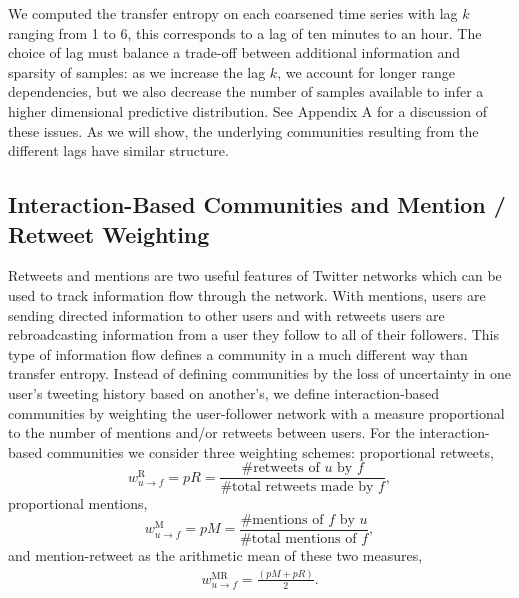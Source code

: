  We computed the transfer entropy on each coarsened time series with lag $k$ ranging from 1 to 6, this corresponds to a lag of ten minutes to an hour. The choice of lag must balance a trade-off between additional information and sparsity of samples: as we increase the lag $k$, we account for longer range dependencies, but we also decrease the number of samples available to infer a higher dimensional predictive distribution. See Appendix A for a discussion of these issues. As we will show, the underlying communities resulting from the different lags have similar structure.

\subsection{Interaction-Based Communities and Mention / Retweet Weighting}
\label{sec:method-interaction}

Retweets and mentions are two useful features of Twitter networks which can be used to track information flow through the network.
With mentions, users are sending directed information to other users and with retweets users are rebroadcasting information from a user they follow to all of their followers. 
This type of information flow defines a community in a much different way than transfer entropy. Instead of defining communities by the loss of uncertainty in one user's tweeting history based on another's, we define interaction-based communities by weighting the user-follower network with a measure proportional to the number of mentions and/or retweets between users. 
For the interaction-based communities we consider three weighting schemes: proportional retweets,
\begin{equation}
w_{u \to f}^{\text{R}}=pR=\frac{\mbox{\# retweets of }u \mbox{ by }f}{\mbox{\# total retweets made by }f},
\end{equation}
proportional mentions,
\begin{equation}
w_{u \to f}^{\text{M}} = pM = \frac{\mbox{\# mentions of }f \mbox{ by }u}{\mbox{\# total mentions of }f},
\end{equation}
and mention-retweet as the arithmetic mean of these two measures,
\begin{align}
	w_{u \to f}^{\text{MR}} = \frac{(pM+pR)}{2}. \label{Eqn-EW-interaction}
\end{align} 


